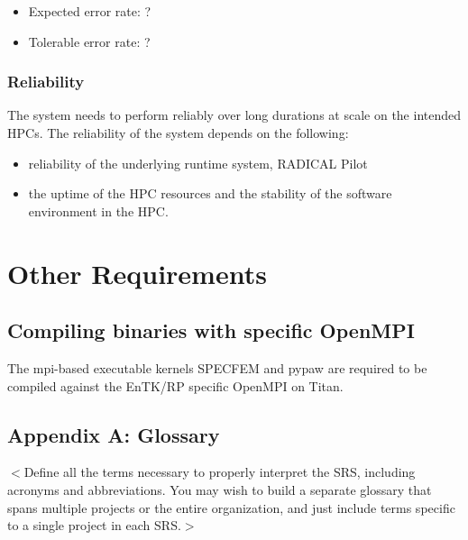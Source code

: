 \documentclass{scrreprt}
\begin{document}
\begin{itemize}[noitemsep]
\item Expected error rate: ?
\item Tolerable error rate: ?
\end{itemize}

\subsection{Reliability}

The system needs to perform reliably over long durations at scale on the intended HPCs. 
The reliability of the system depends on the following:

\begin{itemize}[noitemsep]
\item reliability of the underlying runtime system, RADICAL Pilot
\item the uptime of the HPC resources and the stability of the software environment in the HPC.
\end{itemize}

\chapter{Other Requirements}

\section{Compiling binaries with specific OpenMPI}

The mpi-based executable kernels SPECFEM and pypaw are required to be compiled against the EnTK/RP specific OpenMPI on Titan.

\section{Appendix A: Glossary}
$<$Define all the terms necessary to properly interpret the SRS, including 
acronyms and abbreviations. You may wish to build a separate glossary that spans 
multiple projects or the entire organization, and just include terms specific to 
a single project in each SRS.$>$
\end{document}
